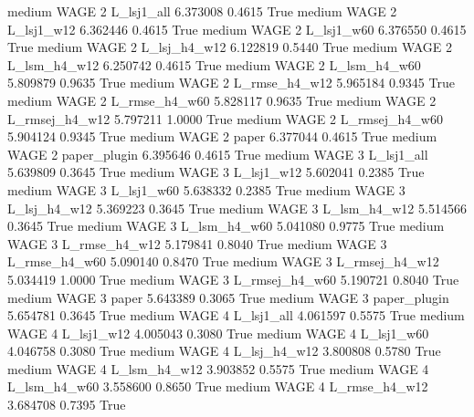     medium     WAGE                 2     L_lsj1_all   6.373008      0.4615    True
    medium     WAGE                 2     L_lsj1_w12   6.362446      0.4615    True
    medium     WAGE                 2     L_lsj1_w60   6.376550      0.4615    True
    medium     WAGE                 2   L_lsj_h4_w12   6.122819      0.5440    True
    medium     WAGE                 2   L_lsm_h4_w12   6.250742      0.4615    True
    medium     WAGE                 2   L_lsm_h4_w60   5.809879      0.9635    True
    medium     WAGE                 2  L_rmse_h4_w12   5.965184      0.9345    True
    medium     WAGE                 2  L_rmse_h4_w60   5.828117      0.9635    True
    medium     WAGE                 2 L_rmsej_h4_w12   5.797211      1.0000    True
    medium     WAGE                 2 L_rmsej_h4_w60   5.904124      0.9345    True
    medium     WAGE                 2          paper   6.377044      0.4615    True
    medium     WAGE                 2   paper_plugin   6.395646      0.4615    True
    medium     WAGE                 3     L_lsj1_all   5.639809      0.3645    True
    medium     WAGE                 3     L_lsj1_w12   5.602041      0.2385    True
    medium     WAGE                 3     L_lsj1_w60   5.638332      0.2385    True
    medium     WAGE                 3   L_lsj_h4_w12   5.369223      0.3645    True
    medium     WAGE                 3   L_lsm_h4_w12   5.514566      0.3645    True
    medium     WAGE                 3   L_lsm_h4_w60   5.041080      0.9775    True
    medium     WAGE                 3  L_rmse_h4_w12   5.179841      0.8040    True
    medium     WAGE                 3  L_rmse_h4_w60   5.090140      0.8470    True
    medium     WAGE                 3 L_rmsej_h4_w12   5.034419      1.0000    True
    medium     WAGE                 3 L_rmsej_h4_w60   5.190721      0.8040    True
    medium     WAGE                 3          paper   5.643389      0.3065    True
    medium     WAGE                 3   paper_plugin   5.654781      0.3645    True
    medium     WAGE                 4     L_lsj1_all   4.061597      0.5575    True
    medium     WAGE                 4     L_lsj1_w12   4.005043      0.3080    True
    medium     WAGE                 4     L_lsj1_w60   4.046758      0.3080    True
    medium     WAGE                 4   L_lsj_h4_w12   3.800808      0.5780    True
    medium     WAGE                 4   L_lsm_h4_w12   3.903852      0.5575    True
    medium     WAGE                 4   L_lsm_h4_w60   3.558600      0.8650    True
    medium     WAGE                 4  L_rmse_h4_w12   3.684708      0.7395    True
